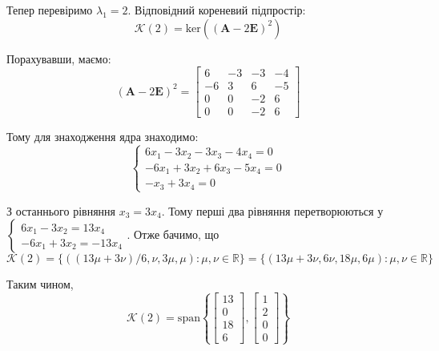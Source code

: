 \documentclass[oneside,solution]{karazin-control-assign}
\begin{document}
Тепер перевіримо $\lambda_1=2$. Відповідний кореневий підпростір:
\begin{equation}
    \mathcal{K}(2) = \text{ker}((\boldsymbol{A}-2\boldsymbol{E})^2)
\end{equation}

Порахувавши, маємо:
\begin{equation}
    (\boldsymbol{A}-2\boldsymbol{E})^2 = \begin{bmatrix}
        6 & -3 & -3 & -4 \\
        -6 & 3 & 6 & -5\\
        0 & 0 & -2 & 6 \\
        0 & 0 & -2 & 6
    \end{bmatrix}
\end{equation}

Тому для знаходження ядра знаходимо:
\begin{equation}
    \begin{cases}6x_1 - 3x_2 - 3x_3 - 4x_4 = 0\\
    -6x_1 + 3x_2 + 6x_3 - 5x_4 = 0\\
    -x_3 + 3x_4 = 0
    \end{cases}
\end{equation}

З останнього рівняння $x_3=3x_4$. Тому перші два рівняння перетворюються у $\begin{cases}
    6x_1 - 3x_2 = 13x_4 \\ 
    -6x_1+3x_2 = -13x_4
\end{cases}$. Отже бачимо, що 
\begin{equation}
    \mathcal{K}(2) = \{((13\mu+3\nu)/6,\nu,3\mu,\mu): \mu,\nu \in \mathbb{R}\} = \{(13\mu+3\nu,6\nu,18\mu,6\mu): \mu,\nu \in \mathbb{R}\}
\end{equation}

Таким чином, 
\begin{equation}
    \mathcal{K}(2) = \text{span}\left\{ \begin{bmatrix}
        13 \\ 0 \\ 18 \\ 6
    \end{bmatrix}, \begin{bmatrix}
        1 \\ 2 \\ 0 \\ 0
    \end{bmatrix}\right\}
\end{equation}
\end{document}
